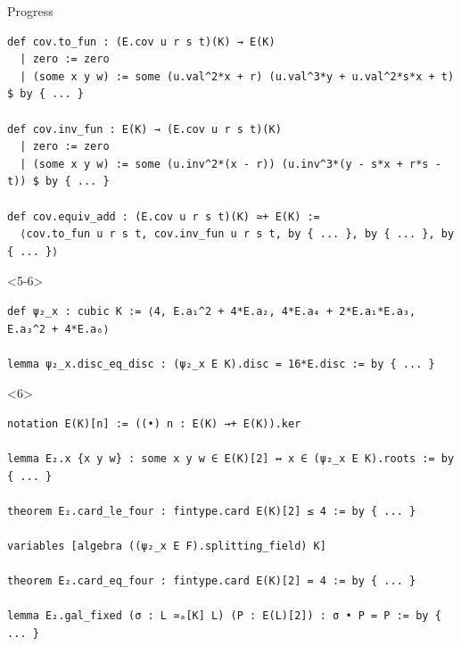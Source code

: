 \documentclass[10pt]{beamer}
\begin{document}
\begin{frame}[fragile, t]{Progress}
\begin{onlyenv}
\begin{lstlisting}[basicstyle=\tiny, frame=single]
def cov.to_fun : (E.cov u r s t)(K) → E(K)
  | zero := zero
  | (some x y w) := some (u.val^2*x + r) (u.val^3*y + u.val^2*s*x + t) $ by { ... }

def cov.inv_fun : E(K) → (E.cov u r s t)(K)
  | zero := zero
  | (some x y w) := some (u.inv^2*(x - r)) (u.inv^3*(y - s*x + r*s - t)) $ by { ... }

def cov.equiv_add : (E.cov u r s t)(K) ≃+ E(K) :=
  ⟨cov.to_fun u r s t, cov.inv_fun u r s t, by { ... }, by { ... }, by { ... }⟩
\end{lstlisting}
\end{onlyenv}


\begin{onlyenv}<5-6>
\begin{lstlisting}[basicstyle=\tiny, frame=single]
def ψ₂_x : cubic K := ⟨4, E.a₁^2 + 4*E.a₂, 4*E.a₄ + 2*E.a₁*E.a₃, E.a₃^2 + 4*E.a₆⟩

lemma ψ₂_x.disc_eq_disc : (ψ₂_x E K).disc = 16*E.disc := by { ... }
\end{lstlisting}
\end{onlyenv}


\begin{onlyenv}<6>
\begin{lstlisting}[basicstyle=\tiny, frame=single]
notation E(K)[n] := ((•) n : E(K) →+ E(K)).ker

lemma E₂.x {x y w} : some x y w ∈ E(K)[2] ↔ x ∈ (ψ₂_x E K).roots := by { ... }

theorem E₂.card_le_four : fintype.card E(K)[2] ≤ 4 := by { ... }

variables [algebra ((ψ₂_x E F).splitting_field) K]

theorem E₂.card_eq_four : fintype.card E(K)[2] = 4 := by { ... }

lemma E₂.gal_fixed (σ : L ≃ₐ[K] L) (P : E(L)[2]) : σ • P = P := by { ... }
\end{lstlisting}
\end{onlyenv}

\end{frame}
\end{document}
